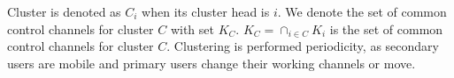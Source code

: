 \documentclass[10pt,journal,compsoc]{IEEEtran}
\theoremstyle{mytheoremstyle}
\theoremstyle{mytheoremstyle}
\theoremstyle{mytheoremstyle}
\newcommand{\ie}{i.e., }
\begin{document}
Cluster is denoted as $C_i$ when its cluster head is $i$.
We denote the set of common control channels for cluster $C$ with set $K_C$.
$ K_C = \cap_{i\in C} K_i$ is the set of common control channels for cluster $C$.
Clustering is performed periodicity, as secondary users are mobile and primary users change their working channels or move.%











\end{document}
